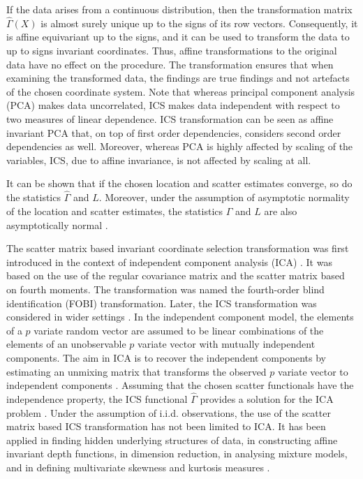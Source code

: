 \documentclass{llncs}
\begin{document}
If the data arises from a continuous distribution, then the transformation matrix $\hat{\Gamma}\left(X\right)$ is almost surely unique up to the signs of its row vectors. Consequently, it is affine equivariant up to the signs, and it can be used to transform the data to up to signs invariant coordinates. Thus, affine  transformations to the original data have no  effect on the procedure. The transformation ensures that when examining the transformed data, the findings are true findings and not artefacts of the chosen coordinate system. 
Note that whereas principal component analysis (PCA) makes data uncorrelated, ICS makes data independent with respect to two measures of linear dependence. ICS transformation can be seen as affine invariant PCA that, on top of first order dependencies, considers second order dependencies as well. Moreover, whereas PCA is highly affected by scaling of the variables,  ICS, due to affine invariance, is not affected by scaling at all.

It can be shown that if the chosen location and scatter estimates converge, so do the statistics $\hat{\Gamma}$ and $L.$ Moreover, under the assumption of asymptotic normality of the location and scatter estimates, the statistics $\hat{\Gamma}$ and $L$ are also asymptotically normal \cite{i4c,i4,i8}.

The scatter matrix based invariant coordinate selection transformation was first introduced in the context of independent component analysis (ICA) \cite{FOBI}. It was based on the use of the regular covariance matrix and the scatter matrix based on fourth moments. The transformation was named the fourth-order blind identification (FOBI) transformation. Later, the ICS transformation was considered in wider settings \cite{TY}. In the independent component model, the elements of a $p$ variate random vector are assumed to be linear combinations of the elements of an unobservable $p$ variate vector with mutually independent components. The aim in ICA is to recover the independent components by estimating an unmixing matrix that transforms the observed $p$ variate vector to  independent components \cite{IN}. Assuming that the chosen scatter functionals have the independence property, the ICS functional $\hat{\Gamma}$ provides a solution for the ICA problem \cite{FOBI,i4,Nordhausen:2008,Oja:2006}.  Under the assumption of i.i.d. observations, the use of the scatter matrix based ICS transformation has not  been limited to ICA. It has been applied in finding hidden underlying structures of data, in constructing affine invariant depth functions, in dimension reduction, in analysing mixture models, and in defining multivariate skewness and kurtosis measures \cite{i4c,i4,i8,Serfling2010,TY}.
\end{document}
